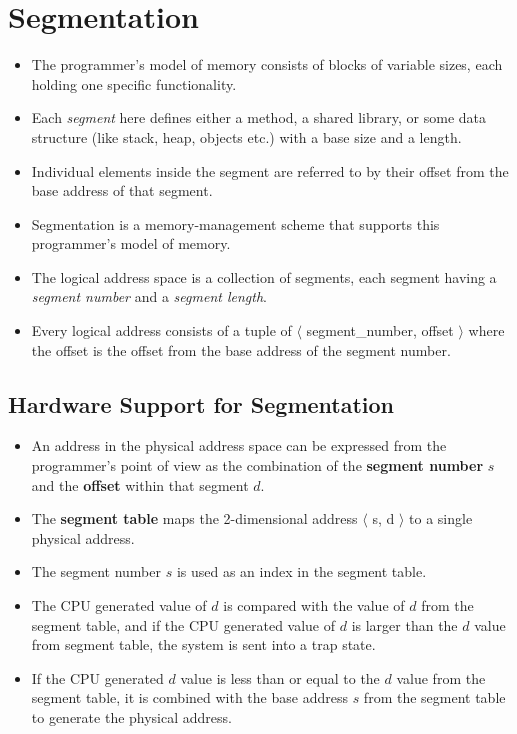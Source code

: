 \documentclass{article}
\theoremstyle{plain}
\theoremstyle{definition}
\begin{document}
\section{Segmentation}
\begin{itemize}
    \item The programmer's model of memory consists of blocks of variable sizes, each holding one specific functionality.
    
    \item Each \textit{segment} here defines either a method, a shared library, or some data structure (like stack, heap, objects etc.) with a base size and a length. 
    
    \item Individual elements inside the segment are referred to by their offset from the base address of that segment.
    
    \item Segmentation is a memory-management scheme that supports this programmer's model of memory.
    
    \item The logical address space is a collection of segments, each segment having a \textit{segment number} and a \textit{segment length}. 
    
    \item Every logical address consists of a tuple of $\langle$ segment\_number, offset $\rangle$ where the offset is the offset from the base address of the segment number.
\end{itemize}

\subsection{Hardware Support for Segmentation}
\begin{itemize}
    \item An address in the physical address space can be expressed from the programmer's point of view as the combination of the \textbf{segment number} $s$ and the \textbf{offset} within that segment $d$. 
    
    \item The \textbf{segment table} maps the 2-dimensional address $\langle$ s, d $\rangle$ to a single physical address. 
    
    \item The segment number $s$ is used as an index in the segment table.
    
    \item The CPU generated value of $d$ is compared with the value of $d$ from the segment table, and if the CPU generated value of $d$ is larger than the $d$ value from segment table, the system is sent into a trap state.
    
    \item If the CPU generated $d$ value is less than or equal to the $d$ value from the segment table, it is combined with the base address $s$ from the segment table to generate the physical address. 
\end{itemize}
\end{document}
